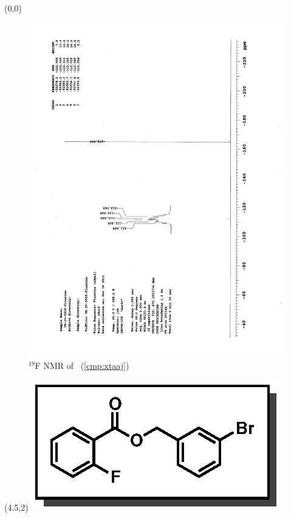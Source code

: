 \clearpage
\begin{textblock}{20}(0,0)
\begin{figure}[htb]
\caption{$^{19}$F NMR of  \CMPxtaaj\ (\ref{cmp:xtaaj})}
\includegraphics[scale=0.75, trim = 0mm 0mm 0mm 5mm,
clip]{chp_asymmetric/images/nmr/xtaajF}
\vspace{-100pt}
\end{figure}
\end{textblock}
\begin{textblock}{1}(4.5,2)
\includegraphics[scale=0.8, angle=90]{chp_asymmetric/images/xtaaj}
\end{textblock}
\clearpage

